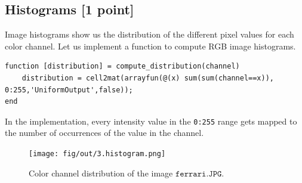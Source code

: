 \documentclass[tikz,14pt,fleqn]{article}
\begin{document}
\subsection{Histograms [1 point]}
Image histograms show us the distribution of the different pixel values for each color channel. Let us implement a function to compute RGB image histograms.
\begin{verbatim}
function [distribution] = compute_distribution(channel)
    distribution = cell2mat(arrayfun(@(x) sum(sum(channel==x)), 0:255,'UniformOutput',false));
end
\end{verbatim}
In the implementation, every intensity value in the \verb|0:255| range gets mapped to the number of occurrences of the value in the channel.
\begin{figure}[h!]
    \centering
    \texttt{[image: fig/out/3.histogram.png]}
    \caption{Color channel distribution of the image $\texttt{ferrari.JPG}$.}
\end{figure}
\end{document}
